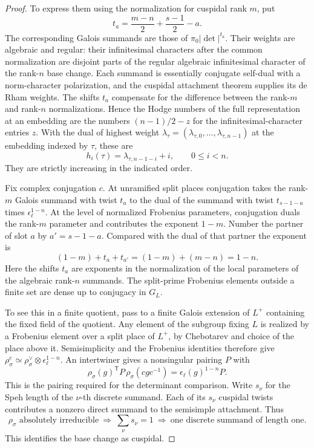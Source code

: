 \begin{proof}
To express them
using the normalization for cuspidal rank \(m\), put
\[
     t_a=\frac{m-n}{2}+\frac{s-1}{2}-a.
\]
The corresponding Galois summands are those of
\(\pi_0|\det|^{t_a}\). Their weights are algebraic and regular:
their infinitesimal characters after the common normalization
are disjoint parts of the regular algebraic infinitesimal
character of the rank-\(n\) base change. Each summand is
essentially conjugate self-dual with a norm-character
polarization, and the cuspidal attachment theorem supplies
its de Rham weights. The shifts \(t_a\) compensate for the
difference between the rank-\(m\) and rank-\(n\)
normalizations. Hence the Hodge numbers of the full
representation at an embedding are the numbers
\((n-1)/2-z\) for the infinitesimal-character entries \(z\).
With the dual of highest weight
\(\lambda_\tau=(\lambda_{\tau,0},\ldots,\lambda_{\tau,n-1})\)
at the embedding indexed by \(\tau\), these are
\[
    h_i(\tau)=\lambda_{\tau,n-1-i}+i,\qquad 0\le i<n.
\]
They are strictly increasing in the indicated order.
\cite{moeglin-waldspurger,blggt}

Fix complex conjugation \(c\). At unramified split places
conjugation takes the rank-\(m\) Galois summand with twist
\(t_a\) to the dual of the summand with twist \(t_{s-1-a}\)
times \(\epsilon_\ell^{1-n}\). At the level of normalized Frobenius parameters, conjugation
duals the rank-\(m\) parameter and contributes the exponent
\(1-m\). Number the partner of slot \(a\) by \(a'=s-1-a\).
Compared with the dual of that partner the exponent is
\[
 (1-m)+t_a+t_{a'}=(1-m)+(m-n)=1-n .
\]
Here the shifts \(t_a\) are exponents in the normalization
of the local parameters of the algebraic rank-\(n\) summands.
The split-prime Frobenius elements outside a finite set
are dense up to conjugacy in \(G_L\).

To see this in a
finite quotient, pass to a finite Galois extension of \(L^+\)
containing the fixed field of the quotient. Any element of
the subgroup fixing \(L\) is realized by a Frobenius element
over a split place of \(L^+\), by Chebotarev and choice of the
place above it. Semisimplicity and the Frobenius identities
therefore give
\(\rho_\sigma^c\simeq \rho_\sigma^\vee\otimes
\epsilon_\ell^{1-n}\).
An intertwiner gives a nonsingular pairing \(P\) with
\[
  \rho_\sigma(g)^{\mathsf T}P\,\rho_\sigma(cgc^{-1})
      =\epsilon_\ell(g)^{1-n}P .
\]
This is the pairing required for the determinant comparison.
Write \(s_\nu\) for the Speh length of the \(\nu\)-th discrete
summand. Each of its \(s_\nu\) cuspidal twists contributes a
nonzero direct summand to the semisimple attachment. Thus
\[
 \rho_\sigma\text{ absolutely irreducible}
 \ \Longrightarrow\ \sum_\nu s_\nu=1
 \ \Longrightarrow\ \text{one discrete summand of length one}.
\]
This identifies the base change as cuspidal.


\end{proof}
